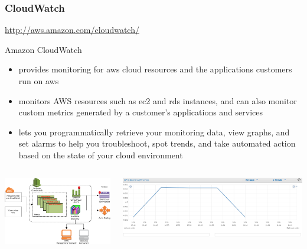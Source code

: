 \documentclass{beamer}
\begin{document}
\begin{frame}
\frametitle[CloudWatch]{CloudWatch}
\url{http://aws.amazon.com/cloudwatch/}

Amazon CloudWatch 
\begin{itemize}
\item provides monitoring for \gls{aws} cloud resources and the applications customers run on \gls{aws}
\item monitors AWS resources such as \gls{ec2} and \gls{rds} instances, and can also monitor custom metrics generated by a customer’s applications and services
\item lets you programmatically retrieve your monitoring data, view graphs, and set alarms to help you troubleshoot, spot trends, and take automated action based on the state of your cloud environment
\end{itemize}
\begin{columns}
\begin{center}
\includegraphics[width=1.0 \textwidth]{CW-Overview.png}
\end{center}
\begin{center}
\includegraphics[width=1.0 \textwidth]{cpuutilization.png}
\end{center}
\end{columns}
\end{frame}
\end{document}

